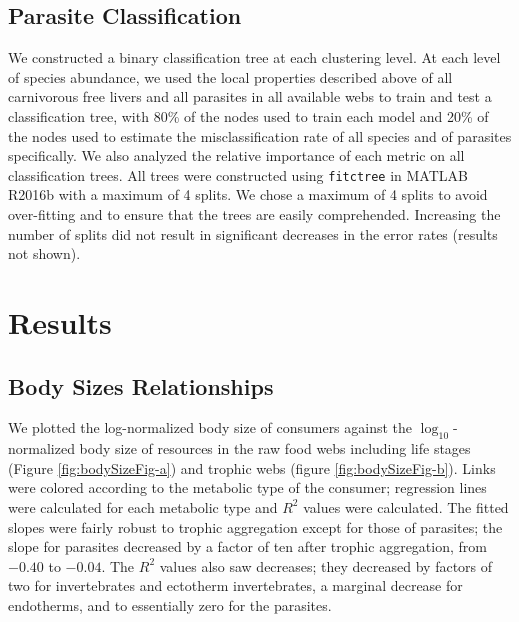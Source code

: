 \documentclass[/home/nkappler/Research/Dissertation/dissertation.tex]{subfiles}
\begin{document}
\begin{bibunit}
\subsection{Parasite Classification} We constructed a binary classification
tree at each clustering level. At each level of species abundance, we used the
local properties described above of all carnivorous free livers and all
parasites in all available webs to train and test a classification tree, with
80\% of the nodes used to train each model and 20\% of the nodes used to
estimate the misclassification rate of all species and of parasites
specifically. We also analyzed the relative importance of each metric on all
classification trees. All trees were constructed using \verb|fitctree| in
MATLAB R2016b with a maximum of 4 splits. We chose a maximum of 4 splits to
avoid over-fitting and to ensure that the trees are easily comprehended.
Increasing the number of splits did not result in significant decreases in the
error rates (results not shown).

\section{Results} 

\subsection{Body Sizes Relationships} We plotted the log-normalized body size
of consumers against the $\log_{10}$-normalized body size of resources in the
raw food webs including life stages (Figure \ref{fig:bodySizeFig-a}) and
trophic webs (figure \ref{fig:bodySizeFig-b}). Links were colored according to
the metabolic type of the consumer; regression lines were calculated for each
metabolic type and $R^2$ values were calculated. The fitted slopes were fairly
robust to trophic aggregation except for those of parasites; the slope for
parasites decreased by a factor of ten after trophic aggregation, from $-0.40$
to $-0.04$. The $R^2$ values also saw decreases; they decreased by factors of
two for invertebrates and ectotherm invertebrates, a marginal decrease for
endotherms, and to essentially zero for the parasites.

\begin{figure}
    \centering
    {%
    }%


\end{figure}
\end{bibunit}
\end{document}
